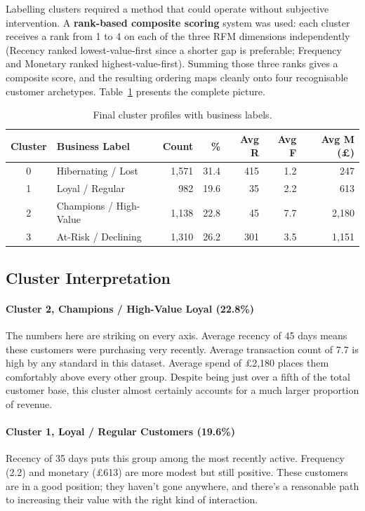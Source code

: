 \documentclass[12pt, a4paper]{article}
\begin{document}
Labelling clusters required a method that could operate without subjective intervention. A \textbf{rank-based composite scoring} system was used: each cluster receives a rank from 1 to 4 on each of the three RFM dimensions independently (Recency ranked lowest-value-first since a shorter gap is preferable; Frequency and Monetary ranked highest-value-first). Summing those three ranks gives a composite score, and the resulting ordering maps cleanly onto four recognisable customer archetypes. Table~\ref{tab:rfm_clusters} presents the complete picture.

\begin{table}[H]
\centering
\caption{Final cluster profiles with business labels.}
\label{tab:rfm_clusters}
\begin{tabular}{@{}clrrrrr@{}}
\toprule
\textbf{Cluster} & \textbf{Business Label} & \textbf{Count} & \textbf{\%} & \textbf{Avg R} & \textbf{Avg F} & \textbf{Avg M (\pounds)} \\
\midrule
0 & Hibernating / Lost       & 1,571 & 31.4 & 415 & 1.2  & 247   \\
1 & Loyal / Regular          & 982   & 19.6 & 35  & 2.2  & 613   \\
2 & Champions / High-Value   & 1,138 & 22.8 & 45  & 7.7  & 2,180 \\
3 & At-Risk / Declining      & 1,310 & 26.2 & 301 & 3.5  & 1,151 \\
\bottomrule
\end{tabular}
\end{table}

\subsection{Cluster Interpretation}

\paragraph{Cluster 2, Champions / High-Value Loyal (22.8\%)}
The numbers here are striking on every axis. Average recency of 45 days means these customers were purchasing very recently. Average transaction count of 7.7 is high by any standard in this dataset. Average spend of \pounds2,180 places them comfortably above every other group. Despite being just over a fifth of the total customer base, this cluster almost certainly accounts for a much larger proportion of revenue.

\paragraph{Cluster 1, Loyal / Regular Customers (19.6\%)}
Recency of 35 days puts this group among the most recently active. Frequency (2.2) and monetary (\pounds613) are more modest but still positive. These customers are in a good position; they haven't gone anywhere, and there's a reasonable path to increasing their value with the right kind of interaction.
\end{document}
